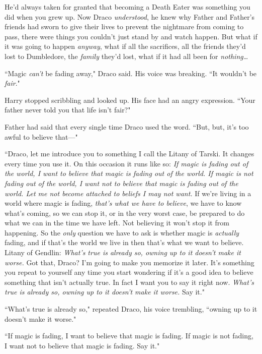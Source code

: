 He'd always taken for granted that becoming a Death Eater was something you did when you grew up. Now Draco \emph{understood}, he knew why Father and Father's friends had sworn to give their lives to prevent the nightmare from coming to pass, there were things you couldn't just stand by and watch happen. But what if it was going to happen \emph{anyway}, what if all the sacrifices, all the friends they'd lost to Dumbledore, the \emph{family} they'd lost, what if it had all been for \emph{nothing{\ldots}}

``Magic \emph{can't} be fading away," Draco said. His voice was breaking. ``It wouldn't be \emph{fair}."

Harry stopped scribbling and looked up. His face had an angry expression. ``Your father never told you that life isn't fair?"

Father had said that every single time Draco used the word. ``But, but, it's too awful to believe that—"

``Draco, let me introduce you to something I call the Litany of Tarski. It changes every time you use it. On this occasion it runs like so: \emph{If magic is fading out of the world, I want to believe that magic is fading out of the world. If magic is not fading out of the world, I want not to believe that magic is fading out of the world. Let me not become attached to beliefs I may not want.} If we're living in a world where magic is fading, \emph{that's what we have to believe}, we have to know what's coming, so we can stop it, or in the very worst case, be prepared to do what we can in the time we have left. Not believing it won't stop it from happening. So the \emph{only} question we have to ask is whether magic is \emph{actually} fading, and if that's the world we live in then that's what we want to believe. Litany of Gendlin: \emph{What's true is already so, owning up to it doesn't make it worse.} Got that, Draco? I'm going to make you memorize it later. It's something you repeat to yourself any time you start wondering if it's a good idea to believe something that isn't actually true. In fact I want you to say it right now. \emph{What's true is already so, owning up to it doesn't make it worse.} Say it."

``What's true is already so," repeated Draco, his voice trembling, ``owning up to it doesn't make it worse."

``If magic is fading, I want to believe that magic is fading. If magic is not fading, I want not to believe that magic is fading. Say it."

